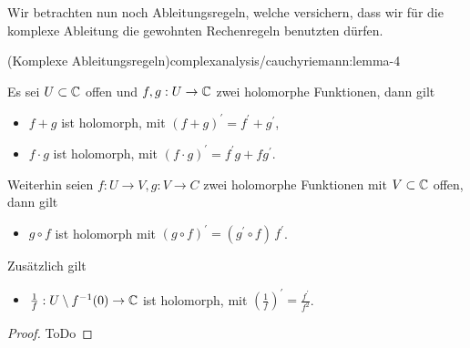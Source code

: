 \par
Wir betrachten nun noch Ableitungsregeln, welche versichern, dass wir für die komplexe Ableitung die gewohnten Rechenregeln benutzten dürfen.
\begin{lemma}{(Komplexe Ableitungsregeln)}{complexanalysis/cauchyriemann:lemma-4}



\par
Es sei \(U\subset\mathbb{C}\) offen und \(f,g:U\to\mathbb{C}\) zwei holomorphe Funktionen, dann gilt
\begin{itemize}
\item {} 
\par
\(f+g\) ist holomorph, mit \((f+g)^\prime = f^\prime + g^\prime\),

\item {} 
\par
\(f\cdot g\) ist holomorph, mit \((f\cdot g)^\prime = f^\prime g+ f g^\prime\).

\end{itemize}

\par
Weiterhin seien \(f:U\to V, g:V\to C\) zwei holomorphe Funktionen mit \(V\subset\mathbb{C}\) offen, dann gilt
\begin{itemize}
\item {} 
\par
\(g\circ f\) ist holomorph mit \((g\circ f)^\prime = (g^\prime \circ f)\, f^\prime\).

\end{itemize}

\par
Zusätzlich gilt
\begin{itemize}
\item {} 
\par
\(\frac{1}{f}: U\setminus f^{-1}(0)\to \mathbb{C}\) ist holomorph, mit \((\frac{1}{f})^\prime = \frac{f^\prime}{f^2}\).

\end{itemize}
\end{lemma}

\begin{proof}
 ToDo
\end{proof}


